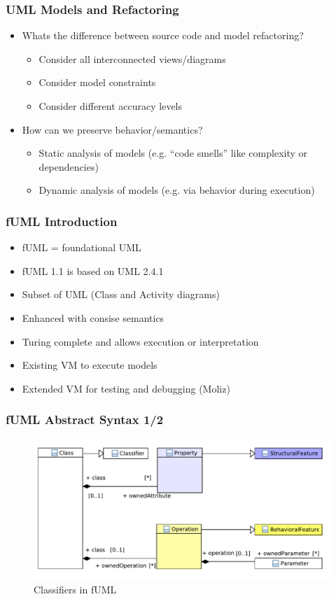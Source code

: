 \documentclass{beamer}
\begin{document}
\begin{frame}
\frametitle{UML Models and Refactoring}
\begin{itemize}
 \item Whats the difference between source code and model refactoring?
 \begin{itemize}
  \item Consider all interconnected views/diagrams
  \item Consider model constraints
  \item Consider different accuracy levels
 \end{itemize}
 \item How can we preserve behavior/semantics?
 \begin{itemize}
  \item Static analysis of models (e.g. ``code smells'' like complexity or dependencies)
  \item Dynamic analysis of models (e.g. via behavior during execution)
 \end{itemize}
\end{itemize}        
\end{frame}
        
\begin{frame}
\frametitle{fUML Introduction}
\begin{itemize}
 \item fUML = foundational UML
 \item fUML 1.1 is based on UML 2.4.1
 \item Subset of UML (Class and Activity diagrams)
 \item Enhanced with consise semantics
 \item Turing complete and allows execution or interpretation
 \item Existing VM to execute models
 \item Extended VM for testing and debugging (Moliz) \cite{DBLP:conf/models/MayerhoferLK12}
\end{itemize}
\end{frame}

\begin{frame}
\frametitle{fUML Abstract Syntax 1/2}
\begin{figure}[h!t]
 \centering
 \includegraphics[scale=0.5]{images/Model_Model_Classifiers}
 \caption{Classifiers in fUML}
 \label{fig:classifiers}
\end{figure}
\end{frame}
\end{document}
